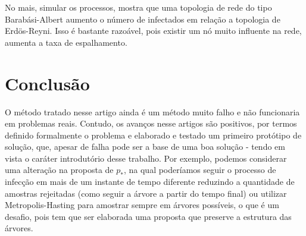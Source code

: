\documentclass{article}
\begin{document}
No mais, simular os processos, mostra que uma topologia de rede do tipo Barabási-Albert aumento o número de infectados em relação a topologia de Erdös-Reyni. Isso é bastante razoável, pois existir um nó muito influente na rede, aumenta a taxa de espalhamento.

\section{Conclusão}

O método tratado nesse artigo ainda é um método muito falho e não funcionaria em problemas reais. Contudo, os avanços nesse artigos são positivos, por termos definido formalmente o problema e elaborado e testado um primeiro protótipo de solução, que, apesar de falha pode ser a base de uma boa solução - tendo em vista o caráter introdutório desse trabalho. Por exemplo, podemos considerar uma alteração na proposta de $p_*$, na qual poderíamos seguir o processo de infecção em mais de um instante de tempo diferente reduzindo a quantidade de amostras rejeitadas (como seguir a árvore a partir do tempo final) ou utilizar Metropolis-Hasting para amostrar sempre em árvores possíveis, o que é um desafio, pois tem que ser elaborada uma proposta que preserve a estrutura das árvores.

\newpage


\nocite{*}


\end{document}

